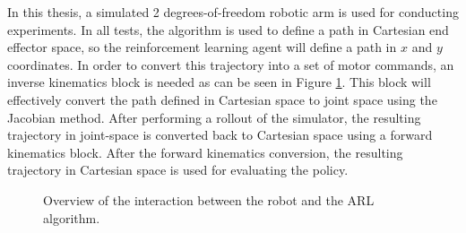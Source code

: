 \documentclass[mscThesis.tex]{subfiles}
\begin{document}
In this thesis, a simulated 2 degrees-of-freedom robotic arm is used for conducting experiments. In all tests, the algorithm is used to define a path in Cartesian end effector space, so the reinforcement learning agent will define a path in $x$ and $y$ coordinates. In order to convert this trajectory into a set of motor commands, an inverse kinematics block is needed as can be seen in Figure \ref{fig:overview-ARL-robot}. This block will effectively convert the path defined in Cartesian space to joint space using the Jacobian method. After performing a rollout of the simulator, the resulting trajectory in joint-space is converted back to Cartesian space using a forward kinematics block. After the forward kinematics conversion, the resulting trajectory in Cartesian space is used for evaluating the policy. 


\begin{figure}[!ht]
\centering
{}
\caption{Overview of the interaction between the robot and the ARL algorithm.}
\label{fig:overview-ARL-robot}
\end{figure}
\end{document}
